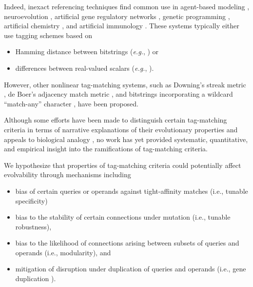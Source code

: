 Indeed, inexact referencing techniques find common use in agent-based modeling \citep{riolo2001evolution}, neuroevolution \citep{reisinger2007acquiring}, artificial gene regulatory networks \citep{banzhaf2003artificial}, genetic programming \citep{spector2011tag, lalejini2018evolving}, artificial chemistry \citep{dittrich2001artificial}, and artificial immunology \citep{timmis2008theoretical}.
These systems typically either use tagging schemes based on
\begin{itemize}
    \item Hamming distance between bitstrings (\textit{e.g.}, \cite{lalejini2018evolving,banzhaf2003artificial}) or
    \item differences between real-valued scalars (\textit{e.g.}, \cite{riolo2001evolution,spector2011tag}).
\end{itemize}
However, other nonlinear tag-matching systems, such as Downing's streak metric \citep{downing2015intelligence}, de Boer's adjacency match metric \citep{DEBOER1991381}, and bitstrings incorporating a wildcard ``match-any'' character \citep{holland2012signals}, have been proposed.

Although some efforts have been made to distinguish certain tag-matching criteria in terms of narrative explanations of their evolutionary properties and appeals to biological analogy \citep{downing2015intelligence,scherer2004activation}, no work has yet provided systematic, quantitative, and empirical insight into the ramifications of tag-matching criteria.

We hypothesize that properties of tag-matching criteria could potentially affect evolvability through mechanisms including
\begin{itemize}
  \item bias of certain queries or operands against tight-affinity matches (i.e., tunable specificity)
  \item bias to the stability of certain connections under mutation (i.e., tunable robustness),
  \item bias to the likelihood of connections arising between subsets of queries and operands (i.e., modularity), and
  \item mitigation of disruption under duplication of queries and operands (i.e., gene duplication \citep{ohno2013evolution, lewis1978gene}).
\end{itemize}


